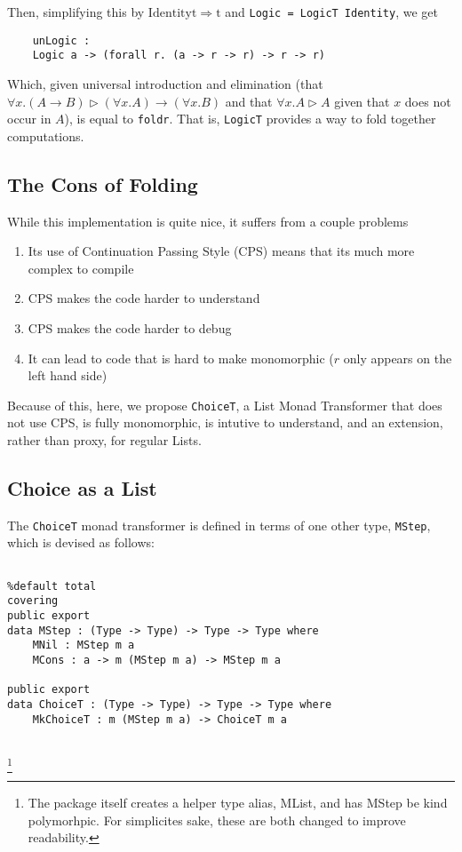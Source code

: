 Then, simplifying this by $\mathrm{Identity t} \Rightarrow \mathrm{t}$ and \verb|Logic = LogicT Identity|, we get 
\begin{verbatim}
	unLogic :
	Logic a -> (forall r. (a -> r -> r) -> r -> r) 
\end{verbatim}

Which, given universal introduction and elimination (that $\forall x . (A \to B) \rhd (\forall x . A) \to (\forall x . B)$ and that $\forall x . A \rhd A$ given that $x$ does not occur in $A$), is equal to \verb|foldr|.
That is, \verb|LogicT| provides a way to fold together computations.

\subsection{The Cons of Folding}

While this implementation is quite nice, it suffers from a couple problems
\begin{enumerate}
	\item Its use of Continuation Passing Style (CPS) means that its much more complex to compile\needcite 
	\item CPS makes the code harder to understand\needcite 
	\item CPS makes the code harder to debug
	\item It can lead to code that is hard to make monomorphic ($r$ only appears on the left hand side)
	
\end{enumerate}

Because of this, here, we propose \verb|ChoiceT|, a List Monad Transformer that does not use CPS, is fully monomorphic, is intutive to understand, and an extension, rather than proxy, for regular Lists.

\subsection{Choice as a List}

The \verb|ChoiceT| monad transformer is defined in terms of one other type, \verb|MStep|, which is devised as follows:

\begin{verbatim}
	
%default total
covering
public export 
data MStep : (Type -> Type) -> Type -> Type where 
	MNil : MStep m a
	MCons : a -> m (MStep m a) -> MStep m a

public export 
data ChoiceT : (Type -> Type) -> Type -> Type where 
	MkChoiceT : m (MStep m a) -> ChoiceT m a
	
\end{verbatim}
\footnote{The package itself creates a helper type alias, \textrm{MList}, and has \textrm{MStep} be kind polymorhpic.
	For simplicites sake, these are both changed to improve readability.}
	
